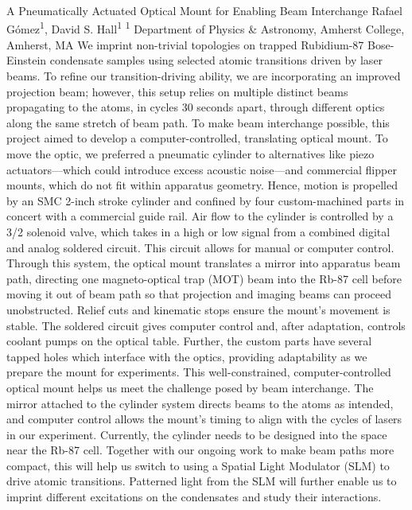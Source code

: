 \makeabstract
    {
    A Pneumatically Actuated Optical Mount for Enabling Beam Interchange
    }
    {
    Rafael G\'omez\textsuperscript{1}, David S. Hall\textsuperscript{1}
    }
    {
    \textsuperscript{1} Department of Physics \& Astronomy, Amherst College, Amherst, MA
    }
    {
    We imprint non-trivial topologies on trapped Rubidium-87 Bose-Einstein condensate samples using selected atomic transitions driven by laser beams. To refine our transition-driving ability, we are incorporating an improved projection beam; however, this setup relies on multiple distinct beams propagating to the atoms, in cycles 30 seconds apart, through different optics along the same stretch of beam path. To make beam interchange possible, this project aimed to develop a computer-controlled, translating optical mount.
    }
    {
    To move the optic, we preferred a pneumatic cylinder to alternatives like piezo actuators---which could introduce excess acoustic noise---and commercial flipper mounts, which do not fit within apparatus geometry. Hence, motion is propelled by an SMC 2-inch stroke cylinder and confined by four custom-machined parts in concert with a commercial guide rail. Air flow to the cylinder is controlled by a 3/2 solenoid valve, which takes in a high or low signal from a combined digital and analog soldered circuit. This circuit allows for manual or computer control. Through this system, the optical mount translates a mirror into apparatus beam path, directing one magneto-optical trap (MOT) beam into the Rb-87 cell before moving it out of beam path so that projection and imaging beams can proceed unobstructed. 
    }
    {
    Relief cuts and kinematic stops ensure the mount{\textquoteright}s movement is stable. The soldered circuit gives computer control and, after adaptation, controls coolant pumps on the optical table. Further, the custom parts have several tapped holes which interface with the optics, providing adaptability as we prepare the mount for experiments.
    }
    {
    This well-constrained, computer-controlled optical mount helps us meet the challenge posed by beam interchange. The mirror attached to the cylinder system directs beams to the atoms as intended, and computer control allows the mount{\textquoteright}s timing to align with the cycles of lasers in our experiment. Currently, the cylinder needs to be designed into the space near the Rb-87 cell. Together with our ongoing work to make beam paths more compact, this will help us switch to using a Spatial Light Modulator (SLM) to drive atomic transitions. Patterned light from the SLM will further enable us to imprint different excitations on the condensates and study their interactions.
    }

    \newpage
    